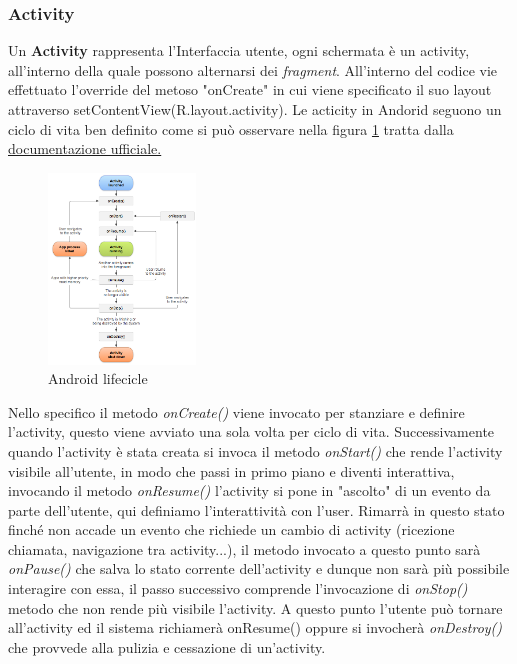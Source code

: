     \subsubsection{Activity} Un \textbf{Activity} rappresenta l'Interfaccia utente, ogni schermata è un activity, all'interno della quale possono alternarsi dei \textit{fragment}. All'interno del codice vie effettuato l'override del metoso "onCreate" in cui viene specificato il suo layout attraverso setContentView(R.layout.activity). Le acticity in Andorid seguono un ciclo di vita ben definito come si può osservare nella figura \ref{fig:lifecicle} tratta dalla \href{https://developer.android.com/guide/components/activities/activity-lifecycle}{documentazione ufficiale.}
        \begin{figure}[h]
        \centering
        \includegraphics[width=0.35\textwidth]{imgs/capitolo2/Applicazioni/activity_lifecycle.png}
        \caption{Android lifecicle}
        \label{fig:lifecicle}
        \end{figure}
        \FloatBarrier %
    Nello specifico il metodo \textit{onCreate()} viene invocato per stanziare e definire l'activity, questo viene avviato una sola volta per ciclo di vita. Successivamente quando l'activity è stata creata si invoca il metodo \textit{onStart()} che rende l'activity visibile all'utente, in modo che passi in primo piano e diventi interattiva, invocando il metodo \textit{onResume()} l'activity si pone in "ascolto" di un evento da parte dell'utente, qui definiamo l'interattività con l'user. Rimarrà in questo stato finché non accade un evento che richiede un cambio di activity (ricezione chiamata, navigazione tra activity...), il metodo invocato a questo punto sarà \textit{onPause()} che salva lo stato corrente dell'activity e dunque non sarà più possibile interagire con essa, il passo successivo comprende l'invocazione di \textit{onStop()} metodo che non rende più visibile l'activity. A questo punto l'utente può tornare all'activity ed il sistema richiamerà onResume() oppure si invocherà \textit{onDestroy()} che provvede alla pulizia e cessazione di un'activity. 

